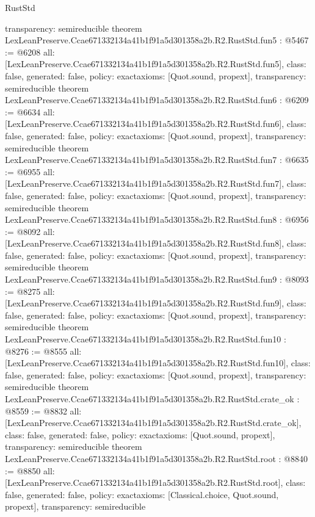 \begin{lexlean}{RustStd}
\begin{coremodule}
{  transparency: semireducible
}
theorem LexLeanPreserve.Ccae671332134a41b1f91a5d301358a2b.R2.RustStd.fun5 : @5467 := @6208 {
  all: [LexLeanPreserve.Ccae671332134a41b1f91a5d301358a2b.R2.RustStd.fun5],
  class: false,
  generated: false,
  policy: exact{axioms: [Quot.sound, propext]},
  transparency: semireducible
}
theorem LexLeanPreserve.Ccae671332134a41b1f91a5d301358a2b.R2.RustStd.fun6 : @6209 := @6634 {
  all: [LexLeanPreserve.Ccae671332134a41b1f91a5d301358a2b.R2.RustStd.fun6],
  class: false,
  generated: false,
  policy: exact{axioms: [Quot.sound, propext]},
  transparency: semireducible
}
theorem LexLeanPreserve.Ccae671332134a41b1f91a5d301358a2b.R2.RustStd.fun7 : @6635 := @6955 {
  all: [LexLeanPreserve.Ccae671332134a41b1f91a5d301358a2b.R2.RustStd.fun7],
  class: false,
  generated: false,
  policy: exact{axioms: [Quot.sound, propext]},
  transparency: semireducible
}
theorem LexLeanPreserve.Ccae671332134a41b1f91a5d301358a2b.R2.RustStd.fun8 : @6956 := @8092 {
  all: [LexLeanPreserve.Ccae671332134a41b1f91a5d301358a2b.R2.RustStd.fun8],
  class: false,
  generated: false,
  policy: exact{axioms: [Quot.sound, propext]},
  transparency: semireducible
}
theorem LexLeanPreserve.Ccae671332134a41b1f91a5d301358a2b.R2.RustStd.fun9 : @8093 := @8275 {
  all: [LexLeanPreserve.Ccae671332134a41b1f91a5d301358a2b.R2.RustStd.fun9],
  class: false,
  generated: false,
  policy: exact{axioms: [Quot.sound, propext]},
  transparency: semireducible
}
theorem LexLeanPreserve.Ccae671332134a41b1f91a5d301358a2b.R2.RustStd.fun10 : @8276 := @8555 {
  all: [LexLeanPreserve.Ccae671332134a41b1f91a5d301358a2b.R2.RustStd.fun10],
  class: false,
  generated: false,
  policy: exact{axioms: [Quot.sound, propext]},
  transparency: semireducible
}
theorem LexLeanPreserve.Ccae671332134a41b1f91a5d301358a2b.R2.RustStd.crate_ok : @8559 := @8832 {
  all: [LexLeanPreserve.Ccae671332134a41b1f91a5d301358a2b.R2.RustStd.crate_ok],
  class: false,
  generated: false,
  policy: exact{axioms: [Quot.sound, propext]},
  transparency: semireducible
}
theorem LexLeanPreserve.Ccae671332134a41b1f91a5d301358a2b.R2.RustStd.root : @8840 := @8850 {
  all: [LexLeanPreserve.Ccae671332134a41b1f91a5d301358a2b.R2.RustStd.root],
  class: false,
  generated: false,
  policy: exact{axioms: [Classical.choice, Quot.sound, propext]},
  transparency: semireducible
}


\end{coremodule}
\end{lexlean}
